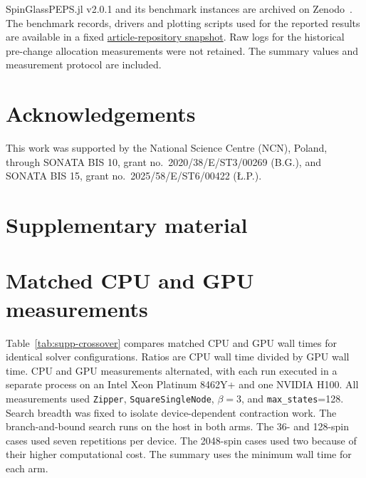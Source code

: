 \documentclass[preprint,12pt,a4paper]{elsarticle}
\begin{document}
SpinGlassPEPS.jl v2.0.1 and its benchmark instances are archived on
Zenodo~\cite{spinglasspeps_zenodo}. The benchmark records, drivers and plotting
scripts used for the reported results are available in a fixed
\href{https://github.com/iitis/spinglass-text/tree/934ca3df6090990424702b1107e349d46f1d1f39/benchmarks}{article-repository snapshot}.
Raw logs for the historical pre-change allocation measurements were not retained.
The summary values and measurement protocol are included.

\section*{Acknowledgements}
\label{acknowledgements}

This work was supported by the National Science Centre (NCN), Poland, through
SONATA BIS 10, grant no.~2020/38/E/ST3/00269 (B.G.), and SONATA BIS 15, grant
no.~2025/58/E/ST6/00422 ({\L}.P.).




\appendix
\setcounter{section}{0}
\setcounter{table}{0}
\setcounter{equation}{0}
\renewcommand{\thesection}{S\arabic{section}}
\renewcommand{\thesubsection}{\thesection.\arabic{subsection}}
\renewcommand{\thetable}{S\arabic{table}}
\renewcommand{\theequation}{S\arabic{equation}}
\renewcommand{\theHsection}{supp.\arabic{section}}
\renewcommand{\theHtable}{supp.\arabic{table}}
\renewcommand{\theHequation}{supp.\arabic{equation}}
\newcommand{\suppdatadir}{\path{benchmarks/}}
\newcommand{\suppfile}[1]{\path{benchmarks/#1}}
\section*{Supplementary material}
\section{Matched CPU and GPU measurements}
\label{sec:supp-crossover}

Table~\ref{tab:supp-crossover} compares matched CPU and GPU wall times for
identical solver configurations. Ratios are CPU wall time divided by GPU wall
time. CPU and GPU measurements alternated, with each run executed in a separate
process on an Intel Xeon Platinum 8462Y+ and one NVIDIA H100. All measurements
used \texttt{Zipper}, \texttt{SquareSingleNode}, $\beta=3$, and
\texttt{max\_states}=128. Search breadth was fixed to isolate device-dependent
contraction work. The branch-and-bound search runs on the host in both arms. The
36- and 128-spin cases used seven repetitions per device. The 2048-spin cases
used two because of their higher computational cost. The summary uses the
minimum wall time for each arm.
\end{document}
